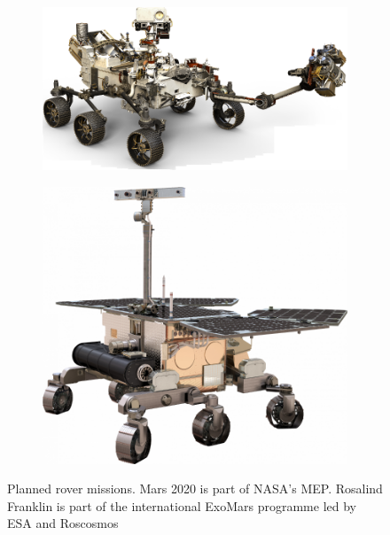 \begin{figure}[h]
\captionsetup[subfigure]{justification=centering}
\vspace{-2ex}
	\centering
    \setlength{\graphicsHeight}{50mm}
    \hypersetup{hidelinks=true}%
	\begin{subfigure}[t]{0.65\textwidth}
        \centering
		\includegraphics[height=\graphicsHeight]{sections/state-of-the-art/planned-missions/images/rover-mars2020.png}
		\label{fig:sub:planned-mission-rover-mars2020}
	\end{subfigure}\hfill
	\begin{subfigure}[t]{0.35\textwidth}
        \centering
		\includegraphics[height=\graphicsHeight]{sections/state-of-the-art/planned-missions/images/rover-exomars.png}
		\label{fig:sub:planned-mission-rover-exomars}
	\end{subfigure}
	\caption[Planned rover missions]
            {Planned rover missions. Mars 2020 is part of \ac{NASA}'s \ac{MEP}. Rosalind Franklin is part of the international ExoMars programme led by \ac{ESA} and Roscosmos}
	\label{fig:planned-mission-rovers}
\vspace{-2ex}
\end{figure}

